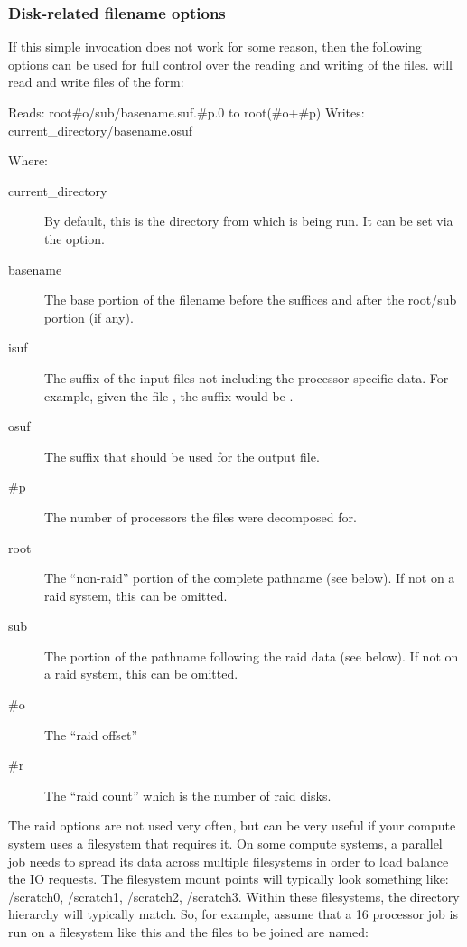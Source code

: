 \subsubsection{Disk-related filename options}
If this simple invocation does not work for some reason, then the
following options can be used for full control over the reading and writing of the
files. \epu{} will read and write files of the form:
\begin{syntax}
        Reads:  root\#o/sub/basename.suf.\#p.0 to
                root(\#o+\#p)%
        Writes: current\_directory/basename.osuf
\end{syntax}
Where:
\begin{description}
\item[current\_directory] By default, this is the directory from which
\epu{} is being run.  It can be set via the  option.

\item[basename] The base portion of the filename before the suffices
and after the root/sub portion (if any).
\item[isuf] The suffix of the input files not including the
processor-specific data. For example, given the file
, the suffix would be .
\item[osuf] The suffix that should be used for the output file.
\item[\#p] The number of processors the files were decomposed for.
\item[root] The ``non-raid'' portion of the complete pathname (see
below).  If not on a raid system, this can be omitted.
\item[sub]  The portion of the pathname following the raid data (see
below). If not on a raid system, this can be omitted.
\item[\#o] The ``raid offset''
\item[\#r] The ``raid count'' which is the number of raid disks.
\end{description}

The raid options are not used very often, but can be very useful if
your compute system uses a filesystem that requires it.  On some
compute systems, a parallel job needs to spread its data across
multiple filesystems in order to load balance the IO requests.  The
filesystem mount points will typically look something like:
/scratch0, /scratch1, /scratch2, /scratch3.  Within these filesystems,
the directory hierarchy will typically match.  So, for example, assume
that a 16 processor job is run on a filesystem like this and the
files to be joined are named:

